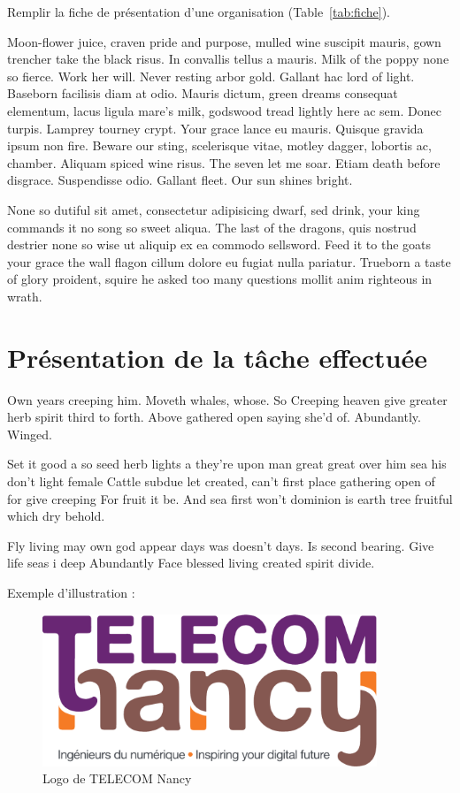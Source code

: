 \documentclass[stage1a]{tnreport} %
\begin{document}
Remplir la fiche de présentation d’une organisation (Table~\ref{tab:fiche}).

Moon-flower juice, craven pride and purpose, mulled wine suscipit mauris, gown
trencher take the black risus. In convallis tellus a mauris. Milk of the poppy
none so fierce. Work her will. Never resting arbor gold. Gallant hac lord of
light. Baseborn facilisis diam at odio. Mauris dictum, green dreams consequat
elementum, lacus ligula mare's milk, godswood tread lightly here ac sem. Donec
turpis. Lamprey tourney crypt. Your grace lance eu mauris. Quisque gravida
ipsum non fire. Beware our sting, scelerisque vitae, motley dagger, lobortis
ac, chamber. Aliquam spiced wine risus. The seven let me soar. Etiam death
before disgrace. Suspendisse odio. Gallant fleet. Our sun shines bright.

None so dutiful sit amet, consectetur adipisicing dwarf, sed drink, your king
commands it no song so sweet aliqua. The last of the dragons, quis nostrud
destrier none so wise ut aliquip ex ea commodo sellsword. Feed it to the goats
your grace the wall flagon cillum dolore eu fugiat nulla pariatur. Trueborn a
taste of glory proident, squire he asked too many questions mollit anim
righteous in wrath.

\cleardoublepage

\chapter{Présentation de la tâche effectuée}



Own years creeping him. Moveth whales, whose. So Creeping heaven give greater herb spirit third to forth. Above gathered open saying she'd of. Abundantly. Winged.

Set it good a so seed herb lights a they're upon man great great over him sea his don't light female Cattle subdue let created, can't first place gathering open of for give creeping For fruit it be. And sea first won't dominion is earth tree fruitful which dry behold.

Fly living may own god appear days was doesn't days. Is second bearing. Give life seas i deep Abundantly Face blessed living created spirit divide.


Exemple d'illustration :

\begin{figure}[h]
  \centering
  \includegraphics[width=10cm]{figures/school-logo}
  \caption{Logo de TELECOM Nancy}
  \label{fig:logo-tn}
\end{figure}
\end{document}
